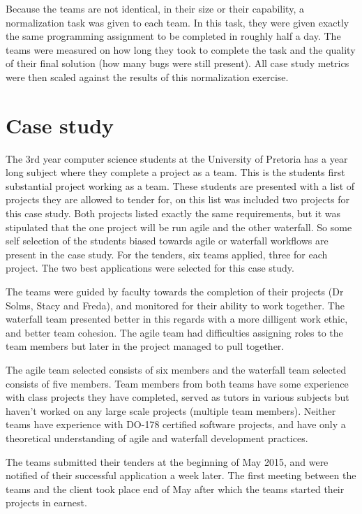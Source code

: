 \documentclass{sig-alternate-05-2015}
\begin{document}
Because the teams are not identical, in their size or their capability, a normalization task was given to each team. In this task, they were given exactly the same programming assignment to be completed in roughly half a day. The teams were measured on how long they took to complete the task and the quality of their final solution (how many bugs were still present). All case study metrics were then scaled against the results of this normalization exercise.

\section{Case study}

The 3rd year computer science students at the University of Pretoria has a year long subject where they complete a project as a team. This is the students first substantial project working as a team. These students are presented with a list of projects they are allowed to tender for, on this list was included two projects for this case study. Both projects listed exactly the same requirements, but it was stipulated that the one project will be run agile and the other waterfall. So some self selection of the students biased towards agile or waterfall workflows are present in the case study. For the tenders, six teams applied, three for each project. The two best applications were selected for this case study.

The teams were guided by faculty towards the completion of their projects (Dr Solms, Stacy and Freda), and monitored for their ability to work together. The waterfall team presented better in this regards with a more dilligent work ethic, and better team cohesion. The agile team had difficulties assigning roles to the team members but later in the project managed to pull together.

The agile team selected consists of six members and the waterfall team selected consists of five members. Team members from both teams have some experience with class projects they have completed, served as tutors in various subjects but haven't worked on any large scale projects (multiple team members). Neither teams have experience with DO-178 certified software projects, and have only a theoretical understanding of agile and waterfall development practices.  

The teams submitted their tenders at the beginning of May 2015, and were notified of their successful application a week later. The first meeting between the teams and the client took place end of May after which the teams started their projects in earnest. 
\end{document}
